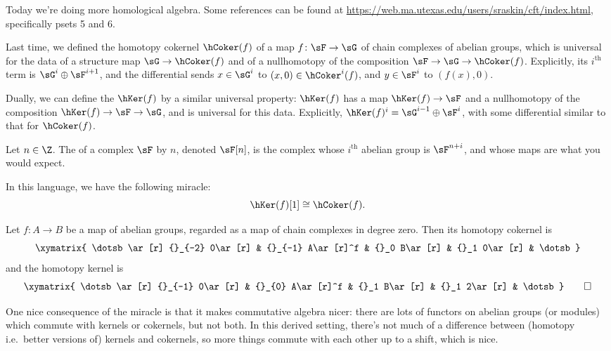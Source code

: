 
Today we're doing more homological algebra. Some references can be found at \url{https://web.ma.utexas.edu/users/sraskin/cft/index.html}, specifically psets 5 and 6.

Last time, we defined the homotopy cokernel $\hCoker(f)$ of a map $f\colon \sF\to\sG$ of chain complexes of abelian groups, which is universal for the data of a structure map $\sG\to\hCoker(f)$ and of a nullhomotopy of the composition $\sF\to\sG\to\hCoker(f)$. Explicitly, its $i^{\mathrm{th}}$ term is $\sG^i\oplus\sF^{i+1}$, and the differential sends $x\in\sG^i$ to $(x,0)\in\hCoker^i(f)$, and $y\in\sF^i$ to $(f(x), 0)$.

Dually, we can define the  $\hKer(f)$ by a similar universal property: $\hKer(f)$ has a map $\hKer(f)\to\sF$ and a nullhomotopy of the composition $\hKer(f)\to\sF\to\sG$, and is universal for this data. Explicitly, $\hKer(f)^i = \sG^{i-1}\oplus\sF^i$, with some differential similar to that for $\hCoker(f)$.
\begin{defn}
Let $n\in\Z$. The  of a complex $\sF$ by $n$, denoted $\sF[n]$, is the complex whose $i^{\mathrm{th}}$ abelian group is $\sF^{n+i}$, and whose maps are what you would expect.
\end{defn}
In this language, we have the following miracle:
\begin{equation}
	\hKer(f)[1] \cong \hCoker(f).
\end{equation}
\begin{exm}
Let $f\colon A\to B$ be a map of abelian groups, regarded as a map of chain complexes in degree zero. Then its homotopy cokernel is
\begin{equation}
\xymatrix{
	\dotsb\ar[r] {}_{-2} 0\ar[r] & {}_{-1} A\ar[r]^f & {}_0 B\ar[r] & {}_1 0\ar[r] & \dotsb
}
\end{equation}
and the homotopy kernel is
\begin{equation}
\xymatrix{
	\dotsb\ar[r] {}_{-1} 0\ar[r] & {}_{0} A\ar[r]^f & {}_1 B\ar[r] & {}_1 2\ar[r] & \dotsb
}\qedhere
\end{equation}
\end{exm}
One nice consequence of the miracle is that it makes commutative algebra nicer: there are lots of functors on abelian groups (or modules) which commute with kernels or cokernels, but not both. In this derived setting, there's not much of a difference between (homotopy i.e.\ better versions of) kernels and cokernels, so more things commute with each other up to a shift, which is nice.

